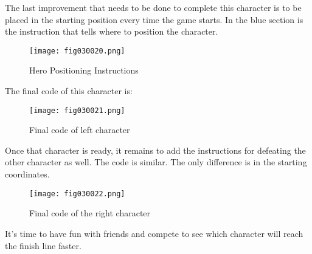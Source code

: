 The last improvement that needs to be done to complete this character is to be placed in the starting position every time the game starts. In the blue section is the instruction that tells where to position the character.

\begin{figure}[H]
   \centering
   \texttt{[image: fig030020.png]}
   \caption{Hero Positioning Instructions}
\label{fig030020}
\end{figure}

The final code of this character is:

\begin{figure}[H]
   \centering
   \texttt{[image: fig030021.png]}
   \caption{Final code of left character}
\label{fig030021}
\end{figure}

Once that character is ready, it remains to add the instructions for defeating the other character as well. The code is similar. The only difference is in the starting coordinates.

\begin{figure}[H]
   \centering
   \texttt{[image: fig030022.png]}
   \caption{Final code of the right character}
\label{fig030022}
\end{figure}

It's time to have fun with friends and compete to see which character will reach the finish line faster.
